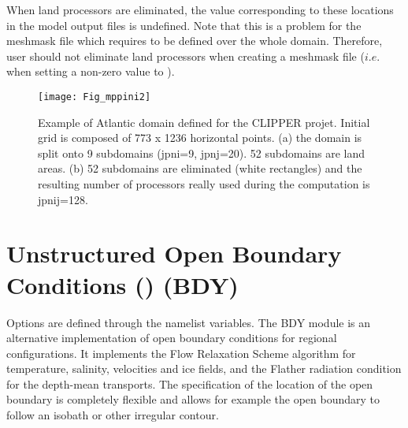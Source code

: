 \documentclass[NEMO_book]{subfiles}
\begin{document}
When land processors are eliminated, the value corresponding to these locations in 
the model output files is undefined. Note that this is a problem for the meshmask file 
which requires to be defined over the whole domain. Therefore, user should not eliminate 
land processors when creating a meshmask file ($i.e.$ when setting a non-zero value to ).

\begin{figure}[!ht]     \begin{center}
\texttt{[image: Fig\_mppini2]}
\caption {    \label{Fig_mppini2}
Example of Atlantic domain defined for the CLIPPER projet. Initial grid is 
composed of 773 x 1236 horizontal points. 
(a) the domain is split onto 9  subdomains (jpni=9, jpnj=20). 
52 subdomains are land areas. 
(b) 52 subdomains are eliminated (white rectangles) and the resulting number 
of processors really used during the computation is jpnij=128.}
\end{center}   \end{figure}


\section{Unstructured Open Boundary Conditions () (BDY)}
\label{LBC_bdy}


Options are defined through the   
  namelist variables.
The BDY module is an alternative implementation of open boundary
conditions for regional configurations. It implements the Flow
Relaxation Scheme algorithm for temperature, salinity, velocities and
ice fields, and the Flather radiation condition for the depth-mean
transports. The specification of the location of the open boundary is
completely flexible and allows for example the open boundary to follow
an isobath or other irregular contour. 
\end{document}
